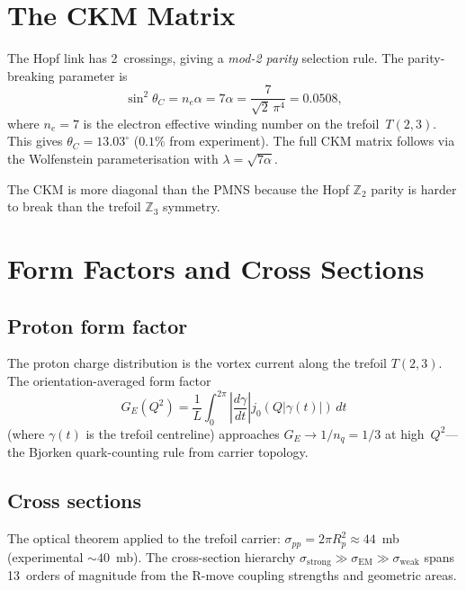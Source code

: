 \documentclass[11pt,a4paper]{article}
\begin{document}
\section{The CKM Matrix}
\label{sec:ckm}

The Hopf link has 2~crossings, giving a \emph{mod-2 parity}
selection rule.  The parity-breaking parameter is
\begin{equation}
  \sin^2\theta_C = n_e \alpha = 7\alpha
    = \frac{7}{\sqrt{2}\,\pi^4} = 0.0508,
  \label{eq:cabibbo}
\end{equation}
where $n_e = 7$ is the electron effective winding number on the
trefoil~$T(2,3)$.  This gives $\theta_C = 13.03^\circ$
($0.1\%$ from experiment).  The full CKM matrix follows via
the Wolfenstein parameterisation with
$\lambda = \sqrt{7\alpha}$.

The CKM is more diagonal than the PMNS because the Hopf
$\mathbb{Z}_2$ parity is harder to break than the trefoil
$\mathbb{Z}_3$ symmetry.


\section{Form Factors and Cross Sections}
\label{sec:formfactors}

\subsection{Proton form factor}

The proton charge distribution is the vortex current along the
trefoil $T(2,3)$.  The orientation-averaged form factor
\begin{equation}
  G_E(Q^2) = \frac{1}{L}\int_0^{2\pi}
    \left|\frac{d\gamma}{dt}\right|
    j_0(Q|\gamma(t)|)\,dt
  \label{eq:GE}
\end{equation}
(where $\gamma(t)$ is the trefoil centreline) approaches
$G_E \to 1/n_q = 1/3$ at high~$Q^2$---the Bjorken quark-counting
rule from carrier topology.

\subsection{Cross sections}

The optical theorem applied to the trefoil carrier:
$\sigma_{pp} = 2\pi R_p^2 \approx 44$~mb (experimental $\sim
40$~mb).  The cross-section hierarchy
$\sigma_{\text{strong}} \gg \sigma_{\text{EM}} \gg
\sigma_{\text{weak}}$ spans 13~orders of magnitude from the
R-move coupling strengths and geometric areas.
\end{document}
